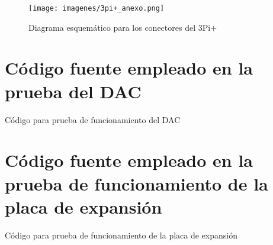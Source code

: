 \begin{figure}[H]
    \centering
    \texttt{[image: imagenes/3pi+\_anexo.png]}
    \caption{Diagrama esquemático para los conectores del 3Pi+}
    \label{fig:3pi+_anexo}
\end{figure}

\section{Código fuente empleado en la prueba del DAC}

\label{sec:codigo_dac}


\begin{table}[H]
    \caption{Código para prueba de funcionamiento del DAC}
\end{table}

\section{Código fuente empleado en la prueba de funcionamiento de la placa de expansión}
\label{sec:codigo_prueba_expansion}
%
\begin{table}[H]
    \caption{Código para prueba de funcionamiento de la placa de expansión}
\end{table}
